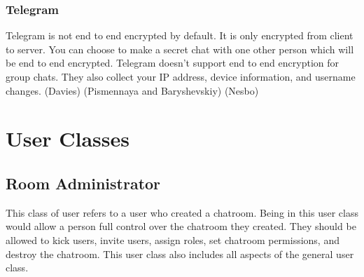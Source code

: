\documentclass[11pt]{article}
\theoremstyle{plain}
\theoremstyle{definition}
\begin{document}
\subsubsection{Telegram}
Telegram is not end to end encrypted by default. It is only encrypted from client to server. You can choose to make a secret chat with one other person which will be end to end encrypted. Telegram doesn't support end to end encryption for group chats. They also collect your IP address, device information, and username changes. (Davies) (Pismennaya and Baryshevskiy) (Nesbo)
\newline \newline




\setlength{\tabcolsep}{4pt} %

\section{User Classes}\label{sec:userclasses}

\subsection{Room Administrator}
This class of user refers to a user who created a chatroom. Being in this user class would allow a person full control over the chatroom they created. They should be allowed to kick users, invite users, assign roles, set chatroom permissions, and destroy the chatroom. This user class also includes all aspects of the general user class. 
\end{document}

